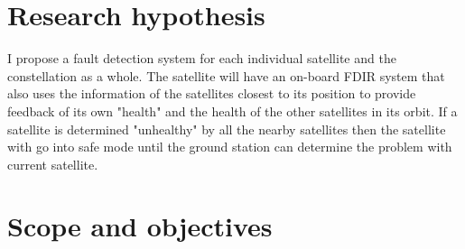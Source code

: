 \section{Research hypothesis}
I propose a fault detection system for each individual satellite and the constellation as a whole. The satellite will have an on-board FDIR system that also uses the information of the satellites closest to its position to provide feedback of its own "health" and the health of the other satellites in its orbit. If a satellite is determined "unhealthy" by all the nearby satellites then the satellite with go into safe mode until the ground station can determine the problem with current satellite.

\section{Scope and objectives}

